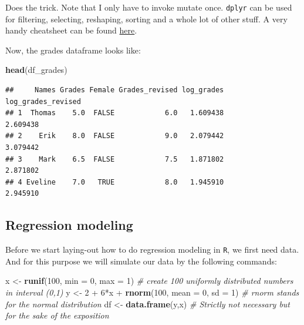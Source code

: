 \documentclass[]{article}
\newenvironment{Shaded}{\begin{snugshade}}{\end{snugshade}}
\newcommand{\KeywordTok}[1]{\textcolor[rgb]{0.13,0.29,0.53}{\textbf{{#1}}}}
\newcommand{\DataTypeTok}[1]{\textcolor[rgb]{0.13,0.29,0.53}{{#1}}}
\newcommand{\DecValTok}[1]{\textcolor[rgb]{0.00,0.00,0.81}{{#1}}}
\newcommand{\StringTok}[1]{\textcolor[rgb]{0.31,0.60,0.02}{{#1}}}
\newcommand{\CommentTok}[1]{\textcolor[rgb]{0.56,0.35,0.01}{\textit{{#1}}}}
\newcommand{\NormalTok}[1]{{#1}}
\begin{document}
Does the trick. Note that I only have to invoke mutate once.
\texttt{dplyr} can be used for filtering, selecting, reshaping, sorting
and a whole lot of other stuff. A very handy cheatsheet can be found
\href{https://www.rstudio.com/wp-content/uploads/2015/02/data-wrangling-cheatsheet.pdf}{here}.

Now, the grades dataframe looks like:

\begin{Shaded}
\begin{Highlighting}[]
\KeywordTok{head}\NormalTok{(df_grades)}
\end{Highlighting}
\end{Shaded}

\begin{verbatim}
##     Names Grades Female Grades_revised log_grades log_grades_revised
## 1  Thomas    5.0  FALSE            6.0   1.609438           2.609438
## 2    Erik    8.0  FALSE            9.0   2.079442           3.079442
## 3    Mark    6.5  FALSE            7.5   1.871802           2.871802
## 4 Eveline    7.0   TRUE            8.0   1.945910           2.945910
\end{verbatim}

\subsection{Regression modeling}\label{regression-modeling}

Before we start laying-out how to do regression modeling in \texttt{R},
we first need data. And for this purpose we will simulate our data by
the following commands:

\begin{Shaded}
\begin{Highlighting}[]
\NormalTok{x <-}\StringTok{ }\KeywordTok{runif}\NormalTok{(}\DecValTok{100}\NormalTok{, }\DataTypeTok{min =} \DecValTok{0}\NormalTok{, }\DataTypeTok{max =} \DecValTok{1}\NormalTok{) }\CommentTok{# create 100 uniformly distributed numbers in interval (0,1)}
\NormalTok{y <-}\StringTok{ }\DecValTok{2} \NormalTok{+}\StringTok{ }\DecValTok{6}\NormalTok{*x +}\StringTok{ }\KeywordTok{rnorm}\NormalTok{(}\DecValTok{100}\NormalTok{, }\DataTypeTok{mean =} \DecValTok{0}\NormalTok{, }\DataTypeTok{sd =} \DecValTok{1}\NormalTok{) }\CommentTok{# rnorm stands for the normal distribution}
\NormalTok{df <-}\StringTok{ }\KeywordTok{data.frame}\NormalTok{(y,x) }\CommentTok{# Strictly not necessary but for the sake of the exposition}
\end{Highlighting}
\end{Shaded}
\end{document}
